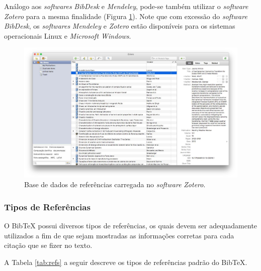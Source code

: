 Análogo aos \textit{softwares} \textit{BibDesk} e \textit{Mendeley}, pode-se também utilizar o \textit{software} \textit{Zotero} para a mesma finalidade (Figura \ref{fig:exe_zotero}). Note que com excessão do \textit{software} \textit{BibDesk}, os \textit{softwares} \textit{Mendeley} e \textit{Zotero} estão disponíveis para os sistemas operacionais Linux e \textit{Microsoft Windows}.

\begin{figure}[H]
\caption{Base de dados de referências carregada no \textit{software} \textit{Zotero}.}
\vspace{6mm}
    \begin{center}
        \includegraphics[scale=0.3]{./docs/figs/zotero.pdf}
    \end{center}
\vspace{4mm}
\label{fig:exe_zotero}
\end{figure}

\subsubsection*{Tipos de Referências}
\label{sec:estilos_refs}

O Bib\TeX{} possui diversos tipos de referências, os quais devem ser adequadamente utilizados a fim de que sejam mostradas as informações corretas para cada citação que se fizer no texto.

A Tabela \ref{tab:refs} a seguir descreve os tipos de referências padrão do Bib\TeX{}.

